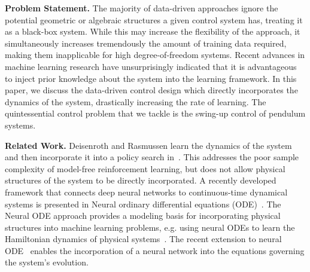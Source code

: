 \textbf{Problem Statement.} 
%
The majority of data-driven approaches ignore the potential geometric or
algebraic structures a given control system has, treating it as a black-box
system. 
%
While this may increase the flexibility of the approach, it simultaneously
increases tremendously the amount of training data required, making them
inapplicable for high degree-of-freedom systems.
%
Recent advances in machine learning research have unsurprisingly indicated that
it is advantageous to inject prior knowledge about the system into the learning
framework.
%
In this paper, we discuss the data-driven control design which directly
incorporates the dynamics of the system, drastically increasing the rate of
learning.
%
The quintessential control problem that we tackle is the swing-up control of
pendulum systems.


\textbf{Related Work.}
%
Deisenroth and Rasmussen learn the dynamics of the system and then incorporate 
it into a policy search in~\citet{deisenroth2011pilco}.
%
This addresses the poor sample complexity of model-free reinforcement learning,
but does not allow physical structures of the system to be directly
incorporated. 
%
A recently developed framework that connects deep neural networks to
continuous-time dynamical systems is presented in Neural ordinary differential
equations (ODE)~\citep{chen2018neural}.
%
The Neural ODE approach provides a modeling basis for incorporating physical
structures into machine learning problems, e.g. using neural ODEs to learn the
Hamiltonian dynamics of physical systems~\citep{zhong2019symplectic}. 
%
%
The recent extension to neural ODE~\citep{rackauckas2020universal} enables
the incorporation of a neural network into the equations
governing the system's evolution. 


